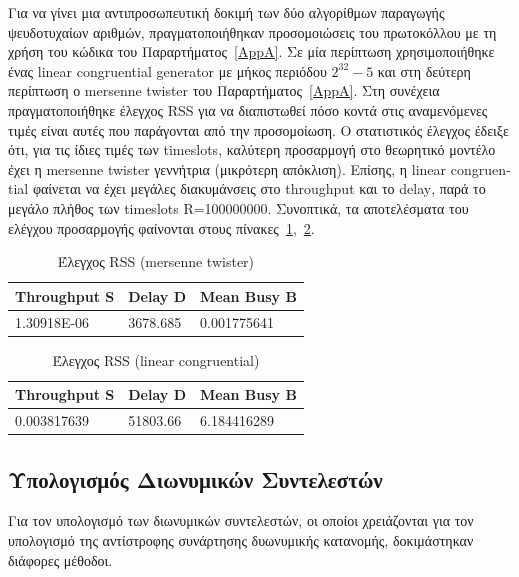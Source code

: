 \documentclass[12pt]{report}
\begin{document}
Για να γίνει μια αντιπροσωπευτική δοκιμή των δύο αλγορίθμων παραγωγής ψευδοτυχαίων αριθμών, πραγματοποιήθηκαν προσομοιώσεις του πρωτοκόλλου με τη χρήση του κώδικα του Παραρτήματος~\ref{AppA}. Σε μία περίπτωση χρησιμοποιήθηκε ένας \textlatin{linear congruential generator} με μήκος περιόδου \(2^{32}-5\) και στη δεύτερη περίπτωση ο \textlatin{mersenne twister} του Παραρτήματος~\ref{AppA}. Στη συνέχεια πραγματοποιήθηκε έλεγχος \textlatin{RSS} για να διαπιστωθεί πόσο κοντά στις αναμενόμενες τιμές είναι αυτές που παράγονται από την προσομοίωση. Ο στατιστικός έλεγχος έδειξε ότι, για τις ίδιες τιμές των \textlatin{timeslots}, καλύτερη προσαρμογή στο θεωρητικό μοντέλο έχει η \textlatin{mersenne twister} γεννήτρια (μικρότερη απόκλιση). Επίσης, η \textlatin{linear congruential} φαίνεται να έχει μεγάλες διακυμάνσεις στο \textlatin{throughput} και το \textlatin{delay}, παρά το μεγάλο πλήθος των \textlatin{timeslots R=100000000}. Συνοπτικά, τα αποτελέσματα του ελέγχου προσαρμογής φαίνονται στους πίνακες~\ref{tab02},~\ref{tab03}.

\begin{table}[h!]
\centering
\scriptsize
\begin{tabular}{||p{2cm}|p{2cm}|p{2cm}||}
\hline
\textlatin{Throughput S} & \textlatin{Delay D} & \textlatin{Mean Busy B} \\ [0.5ex]
\hline\hline
1.30918E-06	& 3678.685 & 0.001775641\\ [1ex] 
\hline
\end{tabular}
\caption{Έλεγχος \textlatin{RSS} (\textlatin{mersenne twister})}
\label{tab02}
\end{table}

\begin{table}[h!]
\centering
\scriptsize
\begin{tabular}{||p{2cm}|p{2cm}|p{2cm}||}
\hline
\textlatin{Throughput S} & \textlatin{Delay D} & \textlatin{Mean Busy B} \\ [0.5ex]
\hline\hline
0.003817639	& 51803.66 & 6.184416289\\ [1ex] 
\hline
\end{tabular}
\caption{Έλεγχος \textlatin{RSS} (\textlatin{linear congruential})}
\label{tab03}
\end{table}

\subsection{Υπολογισμός Διωνυμικών Συντελεστών}
Για τον υπολογισμό των διωνυμικών συντελεστών, οι οποίοι χρειάζονται για τον υπολογισμό της αντίστροφης συνάρτησης δυωνυμικής κατανομής, δοκιμάστηκαν διάφορες μέθοδοι.
\end{document}
